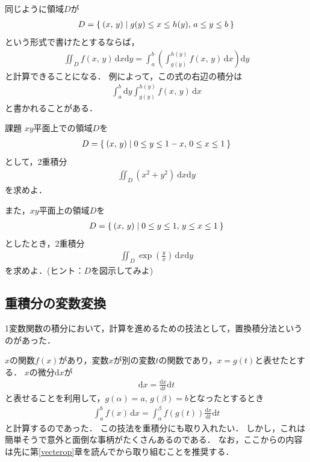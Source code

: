 同じように領域$D$が
\begin{align*}
D = \Set{ (x, \, y) | g(y) \leq x \leq h(y) , \, a \leq y \leq b }
\end{align*}
という形式で書けたとするならば，
\begin{align}
\iint_D f(x, \, y) \, \mathrm{d} x \mathrm{d} y
= \int_a^b \left( \int_{g(y)}^{h(y)} f(x, \, y) \, \mathrm{d} x \right) \mathrm{d}y
\label{eq:ruijisekibunx}
\end{align}
と計算できることになる．
例によって，この式の右辺の積分は
\begin{align*}
\int_a^b \mathrm{d}y  \int_{g(y)}^{h(y)} f(x, \, y) \, \mathrm{d} x 
\end{align*}
と書かれることがある．
\begin{itembox}[l]{課題}
$xy$平面上での領域$D$を
\begin{align*}
D= \Set{ (x, \, y) | 0\leq y\leq 1-x , \, 0 \leq x \leq 1 }
\end{align*}
として，2重積分
\begin{align*}
\iint_{D} (x^2+y^2) \: \mathrm{d}x \mathrm{d}y
\end{align*}
を求めよ．

また，$xy$平面上の領域$D$を
\begin{align*}
D = \Set{ (x, \, y) | 0 \leq y \leq 1 , \, y \leq x \leq 1 }
\end{align*}
としたとき，2重積分
\begin{align*}
\iint_D \exp \left( \frac{y}{x} \right) \, \mathrm{d}x \mathrm{d}y
\end{align*}
を求めよ．(ヒント：$D$を図示してみよ)
\end{itembox}

\subsection{重積分の変数変換}
1変数関数の積分において，計算を進めるための技法として，置換積分法というのがあった．

$x$の関数$f(x)$があり，変数$x$が別の変数$t$の関数であり，$x=g(t)$と表せたとする．
$x$の微分$\mathrm{d}x$が
\begin{align*}
\mathrm{d}x = \frac{ \mathrm{d} x}{\mathrm{d} t } \mathrm{d} t 
\end{align*}
と表せることを利用して，$g(\alpha) = a, \, g(\beta) = b$となったとするとき
\begin{align}
\int_a^b f(x) \, \mathrm{d} x = \int_{\alpha}^{\beta} f(g(t))
\frac{ \mathrm{d} x}{\mathrm{d} t } \mathrm{d} t 
\label{eq:tikansekibun}
\end{align}
と計算するのであった．
この技法を重積分にも取り入れたい．
しかし，これは簡単そうで意外と面倒な事柄がたくさんあるのである．
なお，ここからの内容は先に第\ref{vecterop}章を読んでから取り組むことを推奨する．

